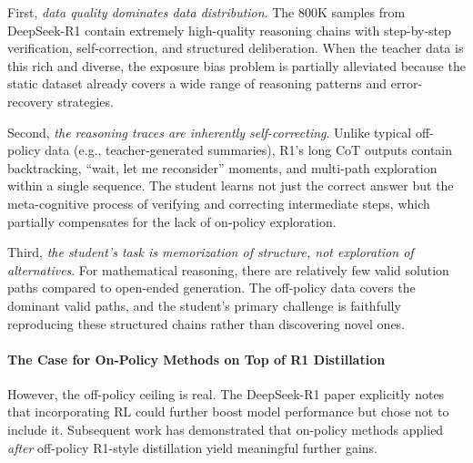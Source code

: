 \documentclass{article} %
\begin{document}
First, \emph{data quality dominates data distribution}. The 800K samples from DeepSeek-R1 contain extremely high-quality reasoning chains with step-by-step verification, self-correction, and structured deliberation. When the teacher data is this rich and diverse, the exposure bias problem is partially alleviated because the static dataset already covers a wide range of reasoning patterns and error-recovery strategies.

Second, \emph{the reasoning traces are inherently self-correcting}. Unlike typical off-policy data (e.g., teacher-generated summaries), R1's long CoT outputs contain backtracking, ``wait, let me reconsider'' moments, and multi-path exploration within a single sequence. The student learns not just the correct answer but the meta-cognitive process of verifying and correcting intermediate steps, which partially compensates for the lack of on-policy exploration.

Third, \emph{the student's task is memorization of structure, not exploration of alternatives}. For mathematical reasoning, there are relatively few valid solution paths compared to open-ended generation. The off-policy data covers the dominant valid paths, and the student's primary challenge is faithfully reproducing these structured chains rather than discovering novel ones.

\paragraph{The Case for On-Policy Methods on Top of R1 Distillation}
However, the off-policy ceiling is real. The DeepSeek-R1 paper explicitly notes that incorporating RL could further boost model performance but chose not to include it. Subsequent work has demonstrated that on-policy methods applied \emph{after} off-policy R1-style distillation yield meaningful further gains.
\end{document}
